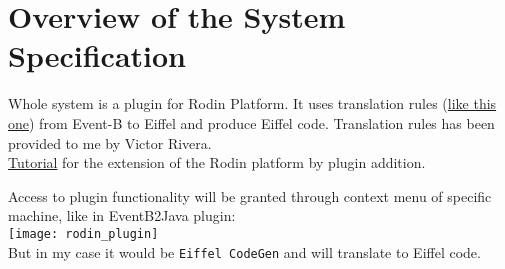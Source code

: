 \section{Overview of the System Specification}

Whole system is a plugin for Rodin Platform. It uses translation rules
(\href{http://poporo.uma.pt/docs/rules.pdf}{like this one})
from Event-B to Eiffel and produce Eiffel code. Translation rules has been
provided to me by Victor Rivera. \\

\href{http://wiki.event-b.org/index.php/Plug-in_Tutorial}{Tutorial}
for the extension of the Rodin platform by plugin addition.

Access to plugin functionality will be granted through context menu of specific
machine, like in EventB2Java plugin:\\[2em]
\texttt{[image: rodin\_plugin]}\\[2em]
But in my case it would be \texttt{Eiffel CodeGen} and will translate to Eiffel 
code.\\

